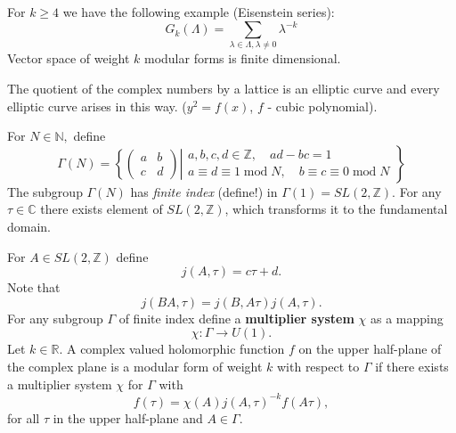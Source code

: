 \documentclass[a4paper,12pt]{article}
\theoremstyle{definition} \newtheorem{Def}{Definition}
\begin{document}
For $k\geq 4$ we have the following example (Eisenstein series):
\begin{equation}
  \label{eq:5}
  G_k(\Lambda)=\sum_{\lambda\in \Lambda, \lambda\neq 0} \lambda^{-k}
\end{equation}
Vector space of weight $k$ modular forms is finite dimensional.

The quotient of the complex numbers by a lattice is an elliptic curve and every elliptic curve arises in this way. ($y^2=f(x)$, $f$ - cubic polynomial).

For $N\in \mathbb{N},$ define
\begin{equation}
  \label{eq:12}
  \Gamma(N)=\left\{
      \begin{pmatrix} a & b \\ c & d
      \end{pmatrix}
      \right|\left.
        \begin{matrix}
          a,b,c,d\in \mathbb{Z},\quad ad-bc=1\\
          a\equiv d\equiv 1\; \text{mod}\; N,\quad b\equiv c\equiv 0\; \text{mod}\; N
        \end{matrix}
      \right\}
  \end{equation}
The subgroup $\Gamma(N)$ has {\it finite index} (define!) in $\Gamma(1)=SL(2,\mathbb{Z})$. For any $\tau\in \mathbb{C}$ there exists element of $SL(2,\mathbb{Z})$, which transforms it to the fundamental domain.

For $A\in SL(2,\mathbb{Z})$ define
\begin{equation}
  \label{eq:13}
  j(A,\tau)=c\tau+d.
\end{equation}
Note that
\begin{equation}
  \label{eq:14}
  j(BA,\tau)=j(B,A\tau)j(A,\tau).
\end{equation}
For any subgroup $\Gamma$ of finite index define a {\bf multiplier system} $\chi$ as a mapping
\begin{equation}
  \label{eq:15}
  \chi:\Gamma\to U(1).
\end{equation}
Let $k\in \mathbb{R}$. A complex valued holomorphic function $f$ on the upper half-plane of the complex plane is a modular form of weight $k$ with respect to $\Gamma$ if there exists a multiplier system $\chi$ for $\Gamma$ with
\begin{equation}
  \label{eq:16}
  f(\tau)=\chi(A) j(A,\tau)^{-k} f(A\tau),
\end{equation}
for all $\tau$ in the upper half-plane and $A\in \Gamma$.
\end{document}
